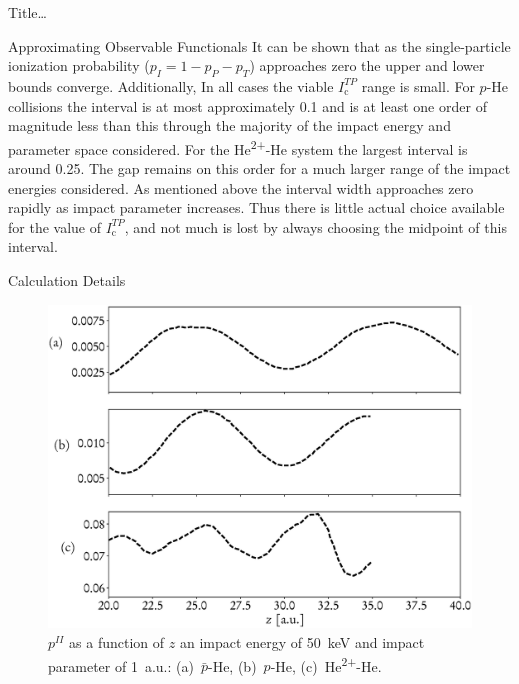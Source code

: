 \documentclass[letterpaper, 11 pt]{report}
\begin{document}
\begin{chapter}{ Title\dots \label{chap:p-he2p-he}}
\begin{section}{Approximating Observable Functionals \label{sec:phe2p-obs}}
      It can be shown that as the single-particle ionization probability ($p_I = 1 - p_P - p_T$)
      approaches zero the upper and lower bounds converge. Additionally, In all cases the viable
      $I_\mathrm{c}^{TP}$ range is small. For $p$-He collisions the interval is at most approximately
      0.1 and is at least one order of magnitude less than this through the majority of the impact
      energy and parameter space considered. For the He\textsuperscript{2+}-He system the largest
      interval is around 0.25. The gap remains on this order for a much larger range of the impact
      energies considered. As mentioned above the interval width approaches zero rapidly as impact
      parameter increases. Thus there is little actual choice available for the value of
      $I_\mathrm{c}^{TP}$, and not much is lost by always choosing the midpoint of this interval.

   \end{section}

   \begin{section}{Calculation Details \label{sec:phe2p-det}}
      
      \begin{figure}[t]
         \begin{minipage}{.49\linewidth}
            
            \centering
            \includegraphics[width = \linewidth]{./images/poz.eps}
            \caption[Probabilities as a function of nuclear separation.]{$p^{II}$ as a
                     function of $z$ an impact energy of 50~keV and impact parameter of 1~a.u.:
                     (a)~$\bar{p}$-He, (b)~$p$-He, (c)~He\textsuperscript{2+}-He. \label{fig:poz}}
         \end{minipage} \hspace{0.04\linewidth} %
         \begin{minipage}{.49\linewidth}
            

\end{minipage}
\end{figure}
\end{section}
\end{chapter}
\end{document}
